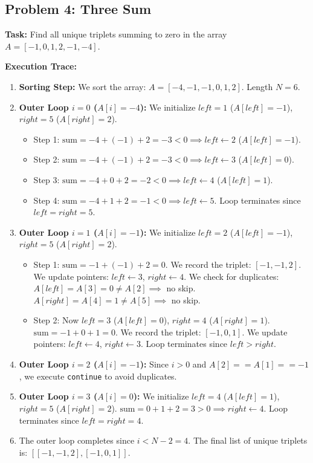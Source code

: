 \documentclass[10pt,journal,compsoc,onecolumn]{IEEEtran}
\begin{document}
\subsection{Problem 4: Three Sum}
\textbf{Task:} Find all unique triplets summing to zero in the array $A = [-1, 0, 1, 2, -1, -4]$.

\textbf{Execution Trace:}
\begin{enumerate}
    \item \textbf{Sorting Step:} We sort the array: $A = [-4, -1, -1, 0, 1, 2]$. Length $N = 6$.
    \item \textbf{Outer Loop $i = 0$ ($A[i] = -4$):}
    We initialize $left = 1$ ($A[left] = -1$), $right = 5$ ($A[right] = 2$).
    \begin{itemize}
        \item Step 1: $\text{sum} = -4 + (-1) + 2 = -3 < 0 \implies left \leftarrow 2$ ($A[left] = -1$).
        \item Step 2: $\text{sum} = -4 + (-1) + 2 = -3 < 0 \implies left \leftarrow 3$ ($A[left] = 0$).
        \item Step 3: $\text{sum} = -4 + 0 + 2 = -2 < 0 \implies left \leftarrow 4$ ($A[left] = 1$).
        \item Step 4: $\text{sum} = -4 + 1 + 2 = -1 < 0 \implies left \leftarrow 5$.
        Loop terminates since $left = right = 5$.
    \end{itemize}
    \item \textbf{Outer Loop $i = 1$ ($A[i] = -1$):}
    We initialize $left = 2$ ($A[left] = -1$), $right = 5$ ($A[right] = 2$).
    \begin{itemize}
        \item Step 1: $\text{sum} = -1 + (-1) + 2 = 0$.
        We record the triplet: \textbf{$[-1, -1, 2]$}.
        We update pointers: $left \leftarrow 3$, $right \leftarrow 4$.
        We check for duplicates: $A[left] = A[3] = 0 \neq A[2] \implies$ no skip. $A[right] = A[4] = 1 \neq A[5] \implies$ no skip.
        \item Step 2: Now $left = 3$ ($A[left] = 0$), $right = 4$ ($A[right] = 1$).
        $\text{sum} = -1 + 0 + 1 = 0$.
        We record the triplet: \textbf{$[-1, 0, 1]$}.
        We update pointers: $left \leftarrow 4$, $right \leftarrow 3$.
        Loop terminates since $left > right$.
    \end{itemize}
    \item \textbf{Outer Loop $i = 2$ ($A[i] = -1$):}
    Since $i > 0$ and $A[2] == A[1] == -1$, we execute \texttt{continue} to avoid duplicates.
    \item \textbf{Outer Loop $i = 3$ ($A[i] = 0$):}
    We initialize $left = 4$ ($A[left] = 1$), $right = 5$ ($A[right] = 2$).
    $\text{sum} = 0 + 1 + 2 = 3 > 0 \implies right \leftarrow 4$.
    Loop terminates since $left = right = 4$.
    \item The outer loop completes since $i < N - 2 = 4$.
    The final list of unique triplets is: \textbf{$[[-1, -1, 2], [-1, 0, 1]]$}.
\end{enumerate}
\end{document}
